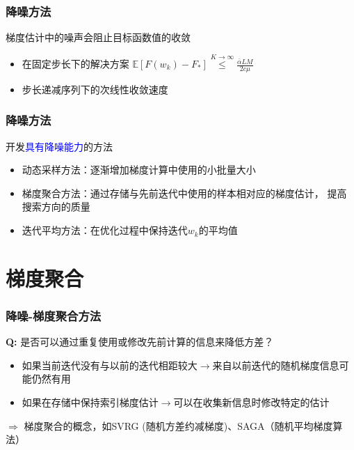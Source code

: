 \documentclass[handout]{beamer}
\begin{document}
\begin{frame}
\frametitle{  降噪方法}

梯度估计中的噪声会阻止目标函数值的收敛
\begin{itemize}
\item 在固定步长下的解决方案
 $\mathbb{E}[F(w_k)-F_*] \stackrel{K\rightarrow\infty}{\leq} \frac{\bar{\alpha}LM}{2c\mu}$

\item 步长递减序列下的次线性收敛速度
\end{itemize}
\end{frame}

\begin{frame}
\frametitle{降噪方法}
开发{\textcolor{blue}{具有降噪能力}}的方法
\begin{itemize}
\item 动态采样方法：逐渐增加梯度计算中使用的小批量大小
\item 梯度聚合方法：通过存储与先前迭代中使用的样本相对应的梯度估计， {\color{dblue}提高搜索方向的质量}
\item 迭代平均方法：在优化过程中保持迭代$w_k$的平均值
\end{itemize}
\end{frame}

\section{梯度聚合}

\begin{frame}
\frametitle{降噪-梯度聚合方法}

{\color{red}\textbf{Q: }是否可以通过重复使用或修改先前计算的信息来降低方差？}

\begin{itemize}
\item 如果当前迭代没有与以前的迭代相距较大$\rightarrow$来自以前迭代的随机梯度信息可能仍然有用

\item 如果在存储中保持索引梯度估计$\rightarrow$可以在收集新信息时修改特定的估计
\end{itemize}

\bigskip

$\Rightarrow$ {\color{dblue}梯度聚合}的概念，如SVRG (随机方差约减梯度)、SAGA（随机平均梯度算法）
\end{frame}
\end{document}
